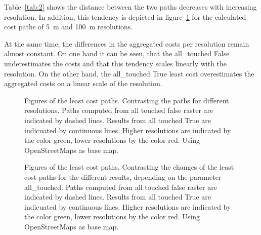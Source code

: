 Table~\ref{tab:2} shows the distance between the two paths decreases
with increasing resolution.
In addition, this tendency is depicted in figure~\ref{fig:paths_resolution} for the calculated cost paths of 5~m and 100~m resolutions.


At the same time, the differences in the aggregated costs per resolution remain almost constant.
On one hand it can be seen, that the all\_touched False underestimates the costs and that this tendency scales
linearly with the resolution.
On the other hand, the all\_touched True least cost overestimates the aggregated costs on a linear scale of
the resolution.


\begin{figure}
	\centering

	\qquad
	\caption{Figures of the least cost paths. Contrasting the paths for different resolutions. Paths computed from all touched false raster are indicated by dashed lines. Results from all touched True are indicuated by continuous lines. Higher resolutions are indicated by the color green, lower resolutions by the color red. Using OpenStreetMaps as base map.}
	\label{fig:paths_resolution}
\end{figure}

\begin{figure}
	\centering

	\qquad

	\caption{Figures of the least cost paths. Contrasting the changes of the least cost paths for the different results, depending on the parameter all\_touched. Paths computed from all touched false raster are indicated by dashed lines. Results from all touched True are indicuated by continuous lines. Higher resolutions are indicated by the color green, lower resolutions by the color red. Using OpenStreetMaps as base map.}
	\label{fig:paths_alltouched}
\end{figure}

